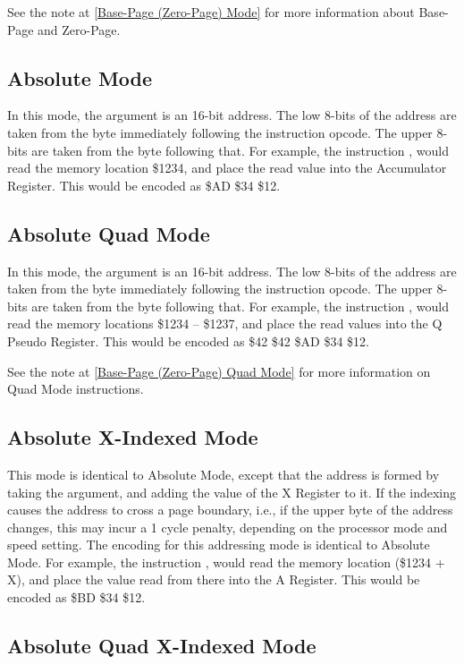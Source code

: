 See the note at \ref{Base-Page (Zero-Page) Mode} for more information about Base-Page and Zero-Page.

\subsection{Absolute Mode}

In this mode, the argument is an 16-bit address.  The low 8-bits of the address are taken from
the byte immediately following the instruction opcode. The upper 8-bits are taken from the
byte following that.  For example, the instruction , would read the
memory location \$1234, and place the read value into the Accumulator Register.  This would
be encoded as \$AD \$34 \$12.

\subsection{Absolute Quad Mode}

In this mode, the argument is an 16-bit address.  The low 8-bits of the address are taken from
the byte immediately following the instruction opcode. The upper 8-bits are taken from the
byte following that.
For example, the instruction , would read the
memory locations \$1234 -- \$1237, and place the read values into the Q Pseudo Register.  This would
be encoded as \$42 \$42 \$AD \$34 \$12.

See the note at \ref{Base-Page (Zero-Page) Quad Mode} for more information on Quad Mode instructions.

\subsection{Absolute X-Indexed Mode}

This mode is identical to Absolute Mode, except that the address is formed by taking the
argument, and adding the value of the X Register to it.  If the indexing causes the address
to cross a page boundary, i.e., if the upper byte of the address changes, this may incur a
1 cycle penalty, depending on the processor mode and speed setting.
The encoding for this addressing mode is identical to Absolute Mode.
For example, the instruction , would read the
memory location (\$1234 + X), and place the value read from there into the A Register.  This would
be encoded as \$BD \$34 \$12.

\subsection{Absolute Quad X-Indexed Mode}

